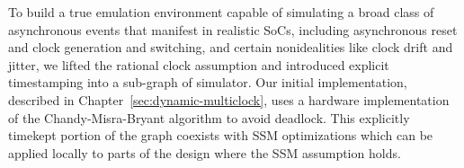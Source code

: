 To build a true emulation environment capable of simulating a broad class of
asynchronous events that manifest in realistic SoCs, including asynchronous
reset and clock generation and switching, and certain nonidealities like clock
drift and jitter, we lifted the rational clock assumption and introduced explicit
timestamping into a sub-graph of simulator. Our initial implementation,
described in Chapter~\ref{sec:dynamic-multiclock}, uses a hardware
implementation of the Chandy-Misra-Bryant algorithm to avoid
deadlock. This explicitly timekept portion of the graph coexists with SSM
optimizations which can be applied locally to parts of the design where the SSM
assumption holds.

%
%
%
%

